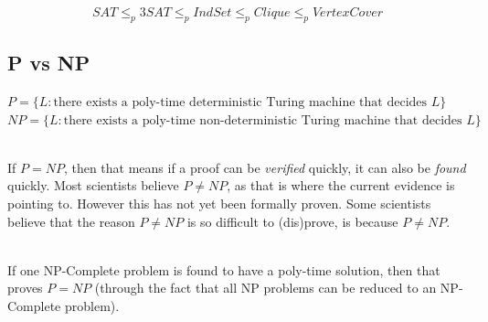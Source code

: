\documentclass[12pt]{article}
\begin{document}
\[ SAT \leq_p 3SAT \leq_p IndSet \leq_p Clique \leq_p VertexCover \]

\subsection*{P vs NP}
$P = \{L : \text{there exists a poly-time deterministic Turing machine that decides } L\}$\\
$NP = \{L : \text{there exists a poly-time non-deterministic Turing machine that decides } L\}$

\noindent
\\
If $P = NP$, then that means if a proof can be \textit{verified} quickly, it can also be \textit{found} quickly.
Most scientists believe $P \neq NP$, as that is where the current evidence is pointing to.
However this has not yet been formally proven.
Some scientists believe that the reason $P \neq NP$ is so difficult to (dis)prove, is because $P \neq NP$.

\noindent
\\
If one NP-Complete problem is found to have a poly-time solution, then that proves $P = NP$ (through the fact that all NP problems can be reduced to an NP-Complete problem).
\end{document}
